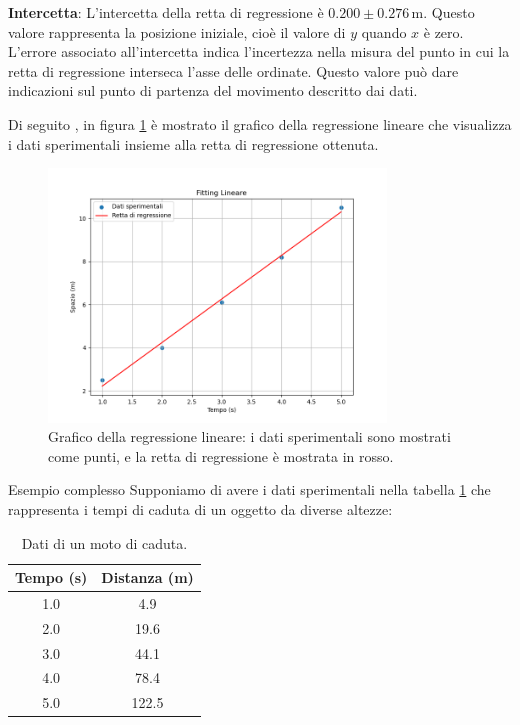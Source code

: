 \documentclass[12pt,a4paper,oneside]{book}
\makeatletter
\renewcommand{\section}{\@startsection{section}{1}{\z@}
{-4ex \@plus -1ex \@minus -.4ex}
{1ex \@plus.2ex }
{\normalfont\large\sffamily\bfseries}}
\theoremstyle{esercizio}
\makeatother
\begin{document}
\textbf{Intercetta}: L'intercetta della retta di regressione è \(0.200 \pm 0.276 \, \si{\meter}\). Questo valore rappresenta la posizione iniziale, cioè il valore di \(y\) quando \(x\) è zero. L'errore associato all'intercetta indica l'incertezza nella misura del punto in cui la retta di regressione interseca l'asse delle ordinate. Questo valore può dare indicazioni sul punto di partenza del movimento descritto dai dati.



Di seguito , in figura \ref{fig:regressione_lineare} è mostrato il grafico della regressione lineare che visualizza i dati sperimentali insieme alla retta di regressione ottenuta.

\begin{figure}[h!]
    \centering
    \includegraphics[width=0.8\textwidth]{img/regressione_lineare.png}
    \caption{Grafico della regressione lineare: i dati sperimentali sono mostrati come punti, e la retta di regressione è mostrata in rosso.}
    \label{fig:regressione_lineare}
\end{figure}


\section{Esempio complesso}
Supponiamo di avere i dati sperimentali nella tabella \ref{tab:regrcompl} che rappresenta i tempi di caduta di un oggetto da diverse altezze:
\begin{table}[h!]
\centering
\begin{tabular}{|c|c|}
\hline
Tempo (s) & Distanza (m) \\
\hline
1.0 & 4.9 \\
2.0 & 19.6 \\
3.0 & 44.1 \\
4.0 & 78.4 \\
5.0 & 122.5 \\
\hline
\end{tabular}
\caption{Dati di un moto di caduta.}
\label{tab:regrcompl}
\end{table}
\end{document}

